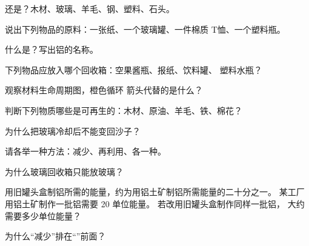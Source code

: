 \begin{exercise}[$\star$]\label{exo:g5:raw-materials-and-recycling:1}
还是？木材、玻璃、羊毛、钢、塑料、石头。
\end{exercise}

\begin{exercise}[$\star$]\label{exo:g5:raw-materials-and-recycling:2}
说出下列物品的原料：一张纸、一个玻璃罐、一件棉质
T恤、一个塑料瓶。
\end{exercise}

\begin{exercise}[$\star$]\label{exo:g5:raw-materials-and-recycling:3}
什么是？写出铝的名称。
\end{exercise}

\begin{exercise}[$\star$]\label{exo:g5:raw-materials-and-recycling:4}
下列物品应放入哪个回收箱：空果酱瓶、报纸、饮料罐、
塑料水瓶？
\end{exercise}

\begin{exercise}[$\star$]\label{exo:g5:raw-materials-and-recycling:5}
观察材料生命周期图，橙色循环
箭头代替的是什么？
\end{exercise}

\begin{exercise}[$\star$]\label{exo:g5:raw-materials-and-recycling:6}
判断下列物质哪些是可再生的：木材、原油、羊毛、铁、棉花？
\end{exercise}

\begin{exercise}[$\star$]\label{exo:g5:raw-materials-and-recycling:7}
为什么把玻璃冷却后不能变回沙子？
\end{exercise}

\begin{exercise}[$\star$]\label{exo:g5:raw-materials-and-recycling:8}
请各举一种方法：减少、再利用、各一种。
\end{exercise}

\begin{exercise}[$\star$]\label{exo:g5:raw-materials-and-recycling:9}
为什么玻璃回收箱只能放玻璃？
\end{exercise}

\begin{exercise}[$\star\star$]\label{exo:g5:raw-materials-and-recycling:10}
用旧罐头盒制铝所需的能量，约为用铝土矿制铝所需能量的二十分之一。
某工厂用铝土矿制作一批铝需要 20 单位能量。
若改用旧罐头盒制作同样一批铝，
大约需要多少单位能量？
\end{exercise}

\begin{exercise}[$\star\star$]\label{exo:g5:raw-materials-and-recycling:11}
为什么“减少”排在“”前面？
\end{exercise}
